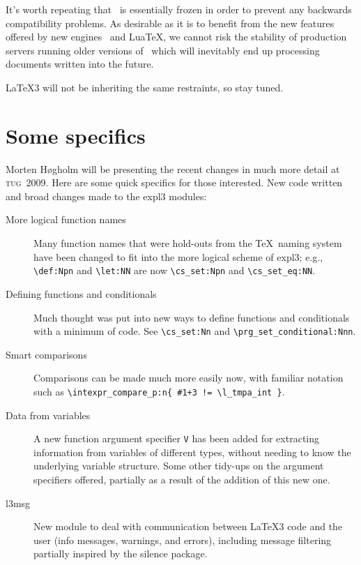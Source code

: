 \documentclass{ltnews}
\newcommand\TUG[1]{\textsc{tug}~#1}
\begin{document}
It's worth repeating that \LaTeXe\ is essentially frozen in order to
prevent any backwards compatibility problems. As desirable as it is
to benefit from the new features offered by new engines \XeTeX\ and
Lua\TeX, we cannot risk the stability of production servers running
older versions of \LaTeXe\ which will inevitably end up processing
documents written into the future.

\LaTeX3 will not be inheriting the same restraints, so stay tuned.

\newpage

\section{Some specifics}

Morten H\o gholm will be presenting the recent changes in much more detail at
\TUG{2009}. Here are some quick specifics for those interested. New code written
and broad changes made to the \textsf{expl3} modules:
\begin{description}
\item [More logical function names]
  Many function names that were hold-outs from the \TeX\ naming system
  have been changed to fit into the more logical scheme of \textsf{expl3}; e.g.,
  \verb|\def:Npn| and \verb|\let:NN| are now \verb|\cs_set:Npn| and
  \verb|\cs_set_eq:NN|.

\item [Defining functions and conditionals]
  Much thought was put into new ways to define
  functions and conditionals with a minimum of code.
  See \verb|\cs_set:Nn| and \verb|\prg_set_conditional:Nnn|.

\item [Smart comparisons]
  Comparisons can be made much more easily now, with familiar notation such as
  \verb|\intexpr_compare_p:n{ #1+3 != \l_tmpa_int }|.

\item [Data from variables] A new function argument specifier \texttt{V} has
  been added for extracting information from variables of different types,
  without needing to know the underlying variable structure. Some other
  tidy-ups on the argument specifiers offered, partially as a result of the
  addition of this new one.

\item [l3msg] New module to deal with communication between \LaTeX3 code
  and the user (info messages, warnings, and errors), including message
  filtering partially inspired by the \textsf{silence} package.
  \end{description}
\end{document}
